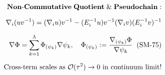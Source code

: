 \documentclass[preview]{standalone}
\begin{document}
\begin{align*}
\special{dvisvgm:raw <g id='unique000'>}\mathbf{Non\text{-}Commutative\;Quotient\;\&\;Pseudochain:}\\[6pt]\nabla_i(uv^{-1}) = (\nabla_i u)v^{-1} - (E_i^{-1}u)v^{-1}(\nabla_i v)(E_i^{-1}v)^{-1}\\[6pt]\nabla\Phi = \sum_{k=1}^\Lambda \Phi_{(\psi_k)}\nabla\psi_k, \quad \Phi_{(\psi_k)} := \frac{\nabla_{(\psi_k)}\Phi}{\nabla\psi_k}\;\;(\text{SM-75})\\[6pt]\text{Cross-term scales as }\mathcal{O}(\tau^2)\to 0\text{ in continuum limit!}\special{dvisvgm:raw </g>}
\end{align*}
\end{document}
